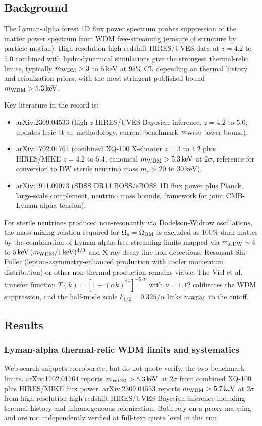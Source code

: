 \documentclass[11pt,a4paper]{article}
\begin{document}
\subsection{Background}
The Lyman-alpha forest 1D flux power spectrum probes suppression of the matter power spectrum from WDM free-streaming (erasure of structure by particle motion). High-resolution high-redshift HIRES/UVES data at $z = 4.2$ to $5.0$ combined with hydrodynamical simulations give the strongest thermal-relic limits, typically $m_{\rm WDM} > 3$ to $5\,\mathrm{keV}$ at $95\%$ CL depending on thermal history and reionization priors, with the most stringent published bound $m_{\rm WDM} > 5.3\,\mathrm{keV}$.

Key literature in the record is:

\begin{itemize}
  \item arXiv:2309.04533 (high-$z$ HIRES/UVES Bayesian inference, $z = 4.2$ to $5.0$, updates Irsic et al. methodology, current benchmark $m_{\rm WDM}$ lower bound).
  \item arXiv:1702.01764 (combined XQ-100 X-shooter $z = 3$ to $4.2$ plus HIRES/MIKE $z = 4.2$ to $5.4$, canonical $m_{\rm WDM} > 5.3\,\mathrm{keV}$ at $2\sigma$, reference for conversion to DW sterile neutrino mass $m_s > 20$ to $30\,\mathrm{keV}$).
  \item arXiv:1911.09073 (SDSS DR14 BOSS/eBOSS 1D flux power plus Planck, large-scale complement, neutrino mass bounds, framework for joint CMB-Lyman-alpha tension).
\end{itemize}
For sterile neutrinos produced non-resonantly via Dodelson-Widrow oscillations, the mass-mixing relation required for $\Omega_s = \Omega_{\rm DM}$ is excluded as $100\%$ dark matter by the combination of Lyman-alpha free-streaming limits mapped via $m_{s,{\rm DW}} \sim 4$ to $5\,\mathrm{keV}\,(m_{\rm WDM}/1\,\mathrm{keV})^{4/3}$ and X-ray decay line non-detections. Resonant Shi-Fuller (lepton-asymmetry-enhanced production with cooler momentum distribution) or other non-thermal production remains viable. The Viel et al. transfer function $T(k) = [1+(\alpha k)^{2\nu}]^{-5/\nu}$ with $\nu = 1.12$ calibrates the WDM suppression, and the half-mode scale $k_{1/2} = 0.325/\alpha$ links $m_{\rm WDM}$ to the cutoff.

\subsection{Results}
\subsubsection{Lyman-alpha thermal-relic WDM limits and systematics}
Web-search snippets corroborate, but do not quote-verify, the two benchmark limits. arXiv:1702.01764 reports $m_{\rm WDM} > 5.3\,\mathrm{keV}$ at $2\sigma$ from combined XQ-100 plus HIRES/MIKE flux power. arXiv:2309.04533 reports $m_{\rm WDM} > 5.7\,\mathrm{keV}$ at $2\sigma$ from high-resolution high-redshift HIRES/UVES Bayesian inference including thermal history and inhomogeneous reionization. Both rely on a proxy mapping and are not independently verified at full-text quote level in this run.
\end{document}
